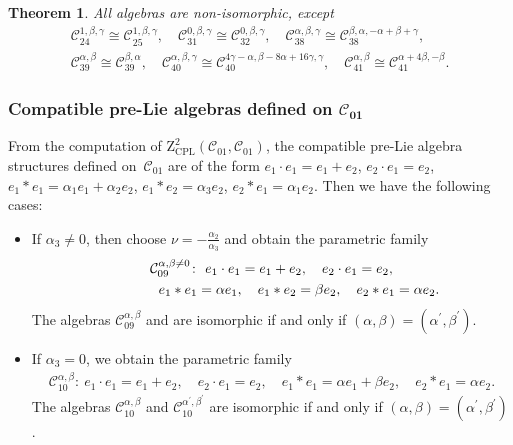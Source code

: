 \documentclass[10pt,a4paper]{amsart}
\numberwithin{equation}{section}
\newtheorem{Theorem}{Theorem}[section]
\begin{document}
\begin{Theorem}
All algebras are non-isomorphic, except
\begin{gather*}
\mathcal{C}_{24}^{1 ,\beta ,\gamma } \cong \mathcal{C}_{25}^{1 , \beta ,\gamma },\quad
\mathcal{C}_{31}^{0 ,\beta ,\gamma } \cong \mathcal{C}_{32}^{0 , \beta ,\gamma },\quad
\mathcal{C}_{38}^{\alpha ,\beta ,\gamma } \cong \mathcal{C}_{38}^{\beta ,\alpha , -\alpha +\beta +\gamma }, \\
 \mathcal{C}_{39}^{\alpha ,\beta } \cong \mathcal{C}_{39}^{\beta,\alpha},\quad
\mathcal{C}_{40}^{\alpha ,\beta ,\gamma } \cong \mathcal{C}_{40}^{4\gamma -\alpha ,\beta
-8\alpha +16\gamma ,\gamma },\quad
 \mathcal{C}_{41}^{\alpha ,\beta } \cong \mathcal{C}%
_{41}^{ \alpha +4\beta ,-\beta }.
\end{gather*}
\end{Theorem}



\subsubsection[Compatible pre-Lie algebras defined on C\_\{01\}]{Compatible pre-Lie algebras defined on $\boldsymbol{\mathcal{C}_{01}}$}

From the computation of $\mathrm{Z}_{\mathrm{CPL}}^{2}(\mathcal{C}_{01},%
\mathcal{C}_{01})$, the compatible pre-Lie algebra structures defined on~$%
\mathcal{C}_{01}$ are of the form
$e_{1}\cdot e_{1}=e_{1}+e_{2}$, $ e_{2}\cdot e_{1}=e_{2}$, $e_{1}\ast e_{1}=\alpha _{1}e_{1}+\alpha _{2}e_{2}$, $e_{1}\ast
e_{2}=\alpha _{3}e_{2}$, $e_{2}\ast e_{1}=\alpha _{1}e_{2}$.
Then we have the following cases:
\begin{itemize}\itemsep=0pt
\item If $\alpha _{3}\neq 0$, then choose $\nu =-\frac{\alpha _{2}}{\alpha
_{3}}$ and obtain the parametric family
\begin{gather*}
\mathcal{C}_{09}^{\alpha ,\beta \neq 0} \colon \
e_{1}\cdot e_{1}=e_{1}+e_{2},\quad e_{2}\cdot e_{1}=e_{2},\\
\hphantom{\mathcal{C}_{09}^{\alpha ,\beta \neq 0} \colon} \ e_{1}\ast e_{1}=\alpha e_{1},\quad e_{1}\ast e_{2}=\beta e_{2},\quad
e_{2}\ast e_{1}=\alpha e_{2}.
\end{gather*}
The algebras $\mathcal{C}_{09}^{\alpha ,\beta }$ and \smash{$\mathcal{C}_{09}^{\alpha
^{\prime },\beta ^{\prime }}$} are isomorphic if and only if $(\alpha,\beta)= (\alpha^{\prime },\beta ^{\prime })$.

\item If $\alpha _{3}=0$, we obtain the parametric family
\begin{gather*}
\mathcal{C}_{10}^{\alpha ,\beta }\colon \
e_{1}\cdot e_{1}=e_{1}+e_{2},\quad e_{2}\cdot e_{1}=e_{2}, \quad e_{1}\ast e_{1}=\alpha e_{1}+\beta e_{2},\quad e_{2}\ast e_{1}=\alpha e_{2}.
\end{gather*}
The algebras $\mathcal{C}_{10}^{\alpha ,\beta }$ and $\mathcal{C}_{10}^{\alpha
^{\prime },\beta ^{\prime }}$ are isomorphic if and only if $(\alpha,\beta)= (\alpha^{\prime },\beta ^{\prime })$.
\end{itemize}
\end{document}
